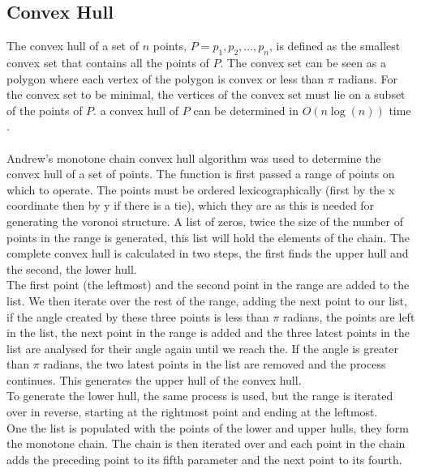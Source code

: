 \subsection{Convex Hull}
The convex hull of a set of $n$ points, $P = {p_1,p_2,...,p_n}$, is defined as the smallest convex set that contains all the points of $P$. The convex set can be seen as a polygon where each vertex of the polygon is convex or less than $\pi$ radians. For the convex set to be minimal, the vertices of the convex set must lie on a subset of the points of $P$. a convex hull of $P$ can be determined in $O(n\log(n))$ time \citep{eddy1977new}.
\\
\\
Andrew's monotone chain convex hull algorithm \citep{andrew1979another} was used to determine the convex hull of a set of points. The function is first passed a range of points on which to operate. The points must be ordered lexicographically (first by the x coordinate then by y if there is a tie), which they are as this is needed for generating the voronoi structure. A list of zeros, twice the size of the number of points in the range is generated, this list will hold the elements of the chain. The complete convex hull is calculated in two steps, the first finds the upper hull and the second, the lower hull.
\\
The first point (the leftmost) and the second point in the range are added to the list. We then iterate over the rest of the range, adding the next point to our list, if the angle created by these three points is less than $\pi$ radians, the points are left in the list, the next point in the range is added and the three latest points in the list are analysed for their angle again until we reach the. If the angle is greater than $\pi$ radians, the two latest points in the list are removed and the process continues. This generates the upper hull of the convex hull.
\\
To generate the lower hull, the same process is used, but the range is iterated over in reverse, starting at the rightmost point and ending at the leftmost.
\\
One the list is populated with the points of the lower and upper hulls, they form the monotone chain. The chain is then iterated over and each point in the chain adds the preceding point to its fifth parameter and the next point to its fourth.


